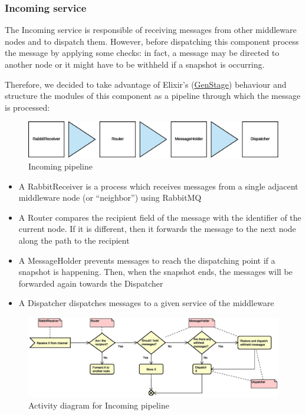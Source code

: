 \subsubsection{Incoming service}
The Incoming service is responsible of receiving messages from other
middleware nodes and to dispatch them.
However, before dispatching this component process the message by applying some
checks: in fact, a message may be directed to another node or it might have to
be withheld if a snapshot is occurring.

Therefore, we decided to take advantage of Elixir's
(\href{https://hexdocs.pm/gen_stage/GenStage.html}{GenStage}) behaviour and
structure the modules of this component as a pipeline through which the
message is processed:

\begin{figure}[H]
  \centering
  \includegraphics[width=\columnwidth]{images/solution/mw/inc/architect.eps}
  \caption{Incoming pipeline}
  \label{fig:mw-incoming}
\end{figure}

\begin{itemize}
  \item A RabbitReceiver is a process which receives messages from a single
    adjacent middleware node (or ``neighbor'') using RabbitMQ
  \item A Router compares the recipient field of the message with the
    identifier of the current node. If it is different, then it forwards the
    message to the next node along the path to the recipient
  \item A MessageHolder prevents messages to reach the dispatching point if a
    snapshot is happening. Then, when the snapshot ends, the messages will be
    forwarded again towards the Dispatcher
  \item A Dispatcher dispatches messages to a given service of the middleware
\end{itemize}

\begin{figure}[H]
  \centering
  \includegraphics[width=\columnwidth]{images/solution/mw/inc/activity.eps}
  \caption{Activity diagram for Incoming pipeline}
  \label{fig:mw-incoming-activity}
\end{figure}

